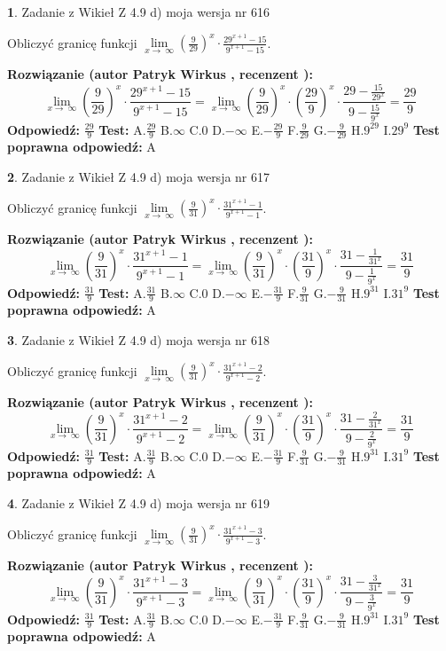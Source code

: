\documentclass[12pt, a4paper]{article}
\theoremstyle{definition} %
\newtheorem{zad}{}
\newcommand{\zadStart}[1]{\begin{zad}#1\newline}
\newcommand{\zadStop}{\end{zad}}
\newcommand{\rozwStart}[2]{\noindent \textbf{Rozwiązanie (autor #1 , recenzent #2): }\newline}
\newcommand{\rozwStop}{\newline}
\newcommand{\odpStart}{\noindent \textbf{Odpowiedź:}\newline}
\newcommand{\odpStop}{\newline}
\newcommand{\testStart}{\noindent \textbf{Test:}\newline}
\newcommand{\testStop}{\newline}
\newcommand{\kluczStart}{\noindent \textbf{Test poprawna odpowiedź:}\newline}
\newcommand{\kluczStop}{\newline}
\begin{document}
\zadStart{Zadanie z Wikieł Z 4.9 d) moja wersja nr 616}


Obliczyć granicę funkcji  $\lim\limits_{x\to\ \infty}(\frac{9}{29})^{x}\cdot\frac{29^{x+1}-15}{9^{x+1}-15}$.
\zadStop
\rozwStart{Patryk Wirkus}{}
$$\lim\limits_{x\to\ \infty}(\frac{9}{29})^{x}\cdot\frac{29^{x+1}-15}{9^{x+1}-15}=\lim\limits_{x\to\ \infty}(\frac{9}{29})^{x}\cdot(\frac{29}{9})^{x} \cdot \frac{29-\frac{15}{29^{x}}}{9-\frac{15}{9^{x}}} = \frac{29}{9}$$
\rozwStop
\odpStart
$\frac{29}{9}$
\odpStop
\testStart
A.$\frac{29}{9}$ B.$\infty$ C.$0$ D.$-\infty$ E.$-\frac{29}{9}$
F.$\frac{9}{29}$ G.$-\frac{9}{29}$
H.$9^{29}$
I.$29^{9}$
\testStop
\kluczStart
A
\kluczStop



\zadStart{Zadanie z Wikieł Z 4.9 d) moja wersja nr 617}


Obliczyć granicę funkcji  $\lim\limits_{x\to\ \infty}(\frac{9}{31})^{x}\cdot\frac{31^{x+1}-1}{9^{x+1}-1}$.
\zadStop
\rozwStart{Patryk Wirkus}{}
$$\lim\limits_{x\to\ \infty}(\frac{9}{31})^{x}\cdot\frac{31^{x+1}-1}{9^{x+1}-1}=\lim\limits_{x\to\ \infty}(\frac{9}{31})^{x}\cdot(\frac{31}{9})^{x} \cdot \frac{31-\frac{1}{31^{x}}}{9-\frac{1}{9^{x}}} = \frac{31}{9}$$
\rozwStop
\odpStart
$\frac{31}{9}$
\odpStop
\testStart
A.$\frac{31}{9}$ B.$\infty$ C.$0$ D.$-\infty$ E.$-\frac{31}{9}$
F.$\frac{9}{31}$ G.$-\frac{9}{31}$
H.$9^{31}$
I.$31^{9}$
\testStop
\kluczStart
A
\kluczStop



\zadStart{Zadanie z Wikieł Z 4.9 d) moja wersja nr 618}


Obliczyć granicę funkcji  $\lim\limits_{x\to\ \infty}(\frac{9}{31})^{x}\cdot\frac{31^{x+1}-2}{9^{x+1}-2}$.
\zadStop
\rozwStart{Patryk Wirkus}{}
$$\lim\limits_{x\to\ \infty}(\frac{9}{31})^{x}\cdot\frac{31^{x+1}-2}{9^{x+1}-2}=\lim\limits_{x\to\ \infty}(\frac{9}{31})^{x}\cdot(\frac{31}{9})^{x} \cdot \frac{31-\frac{2}{31^{x}}}{9-\frac{2}{9^{x}}} = \frac{31}{9}$$
\rozwStop
\odpStart
$\frac{31}{9}$
\odpStop
\testStart
A.$\frac{31}{9}$ B.$\infty$ C.$0$ D.$-\infty$ E.$-\frac{31}{9}$
F.$\frac{9}{31}$ G.$-\frac{9}{31}$
H.$9^{31}$
I.$31^{9}$
\testStop
\kluczStart
A
\kluczStop



\zadStart{Zadanie z Wikieł Z 4.9 d) moja wersja nr 619}


Obliczyć granicę funkcji  $\lim\limits_{x\to\ \infty}(\frac{9}{31})^{x}\cdot\frac{31^{x+1}-3}{9^{x+1}-3}$.
\zadStop
\rozwStart{Patryk Wirkus}{}
$$\lim\limits_{x\to\ \infty}(\frac{9}{31})^{x}\cdot\frac{31^{x+1}-3}{9^{x+1}-3}=\lim\limits_{x\to\ \infty}(\frac{9}{31})^{x}\cdot(\frac{31}{9})^{x} \cdot \frac{31-\frac{3}{31^{x}}}{9-\frac{3}{9^{x}}} = \frac{31}{9}$$
\rozwStop
\odpStart
$\frac{31}{9}$
\odpStop
\testStart
A.$\frac{31}{9}$ B.$\infty$ C.$0$ D.$-\infty$ E.$-\frac{31}{9}$
F.$\frac{9}{31}$ G.$-\frac{9}{31}$
H.$9^{31}$
I.$31^{9}$
\testStop
\kluczStart
A
\kluczStop
\end{document}
